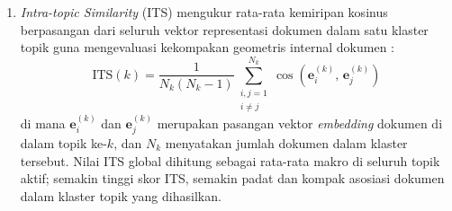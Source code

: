 \begin{enumerate}[label=\alph*.]
	\item \textit{Intra-topic Similarity} (ITS) mengukur rata-rata kemiripan kosinus berpasangan dari seluruh vektor representasi dokumen dalam satu klaster topik guna mengevaluasi kekompakan geometris internal dokumen \citep{10.1007/s11257-022-09351-w}:
	\begin{equation}
		\text{ITS}(k) = \frac{1}{N_k(N_k - 1)} \sum_{\substack{i,j=1 \\ i \neq j}}^{N_k} \cos\!\left(\mathbf{e}_i^{(k)},\, \mathbf{e}_j^{(k)}\right)
	\end{equation}
	di mana $\mathbf{e}_i^{(k)}$ dan $\mathbf{e}_j^{(k)}$ merupakan pasangan vektor \textit{embedding} dokumen di dalam topik ke-$k$, dan $N_k$ menyatakan jumlah dokumen dalam klaster tersebut. Nilai ITS global dihitung sebagai rata-rata makro di seluruh topik aktif; semakin tinggi skor ITS, semakin padat dan kompak asosiasi dokumen dalam klaster topik yang dihasilkan.
\end{enumerate}


%
%
%
%
